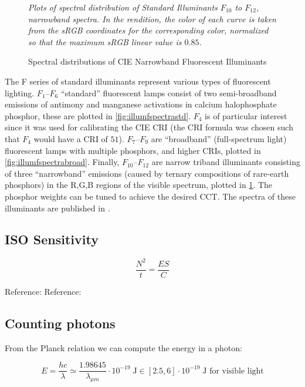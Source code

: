 \begin{figure}
{
\small
\centering

\caption{Spectral distributions of CIE Narrowband Fluorescent Illuminants}
\label{fig:illumfspectranarrow}
}
\vskip 1mm
{\footnotesize\it Plots of spectral distribution of
Standard Illuminants $F_{10}$ to $F_{12}$, narrowband spectra.
In the rendition, the color of each curve is taken from the
sRGB coordinates for the corresponding color,
normalized so that the maximum sRGB linear value is $0.85$.
}
\end{figure}

The F series of standard illuminants represent various types of fluorescent lighting.
$F_1$--$F_6$ ``standard'' fluorescent lamps consist of two semi-broadband
emissions of
antimony and manganese activations in calcium halophosphate phosphor, these are
plotted in \cref{fig:illumfspectrastd}. $F_4$ is of
particular interest since it was used for calibrating the \gls{CIE} \gls{CRI}
(the \gls{CRI} formula was chosen such that $F_4$ would have a \gls{CRI} of
$51$).
$F_7$--$F_9$ are ``broadband'' (full-spectrum light) fluorescent lamps with
multiple phosphors, and higher \glspl{CRI}, plotted in
\cref{fig:illumfspectrabroad}. Finally, $F_{10}$--$F_{12}$ are narrow
triband illuminants consisting of three ``narrowband'' emissions (caused by
ternary
compositions of rare-earth phosphors) in the R,G,B regions of the visible
spectrum, plotted in \cref{fig:illumfspectranarrow}.
The phosphor weights can be tuned to achieve the desired \gls{CCT}.
The spectra of these illuminants are published in \cite{ciecolorimetry}.

\ifomit
\subsection{ISO Sensitivity}

\begin{equation}
\frac{N^2}t = \frac{ES}{C}
\end{equation}

Reference: 
Reference: 

\subsection{Counting photons}

From the Planck relation we can compute the energy in a photon:

\begin{equation}
E = \frac{hc}{\lambda} \simeq \frac{1.98645}{\lambda_{\mu m}}\cdot 10^{-19} \;\unit{\joule} \in [2.5, 6]\cdot 10^{-19} \;\unit{\joule} \text{~for visible light}
\end{equation}

